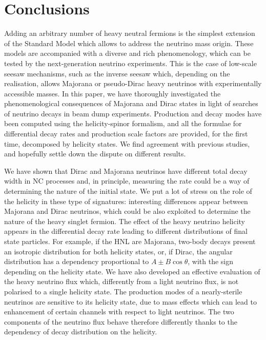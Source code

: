 \clearpage
\chapter{Conclusions}
\label{sec:conclusions}

Adding an arbitrary number of heavy neutral fermions is the simplest extension of the Standard Model which allows to address the neutrino mass origin.
These models are accompanied with a diverse and rich phenomenology, %
which can be tested by the next-generation neutrino experiments.
This is the case of low-scale seesaw mechanisms, such as the inverse seesaw %
which, depending on the realisation, allows Majorana or pseudo-Dirac heavy neutrinos with experimentally accessible masses.
In this paper, we have thoroughly investigated the phenomenological consequences of Majorana and Dirac states %
in light of searches of neutrino decays in beam dump experiments.
Production and decay modes have been computed using the helicity-spinor formalism, %
and all the formulae for differential decay rates and production scale factors are provided, for the first time, decomposed by helicity states.
We find agreement with previous studies, and hopefully settle down the dispute on different results.

We have shown that Dirac and Majorana neutrinos have different total decay width in NC processes %
and, in principle, measuring the rate could be a way of determining the nature of the initial state.
We put a lot of stress on the role of the helicity in these type of signatures: %
interesting differences appear between Majorana and Dirac neutrinos, which could be also %
exploited to determine the nature of the heavy singlet fermion.
The effect of the heavy neutrino helicity appears in the differential decay rate leading to different %
distributions of final state particles. %
For example, if the HNL are Majorana, two-body decays present an isotropic distribution for both helicity states, %
or, if Dirac, the angular distribution has a dependency proportional to $A\pm B \cos\theta$, %
with the sign depending on the helicity state.
We have also developed an effective evaluation of the heavy neutrino flux which, differently from a light neutrino flux, %
is not polarised to a single helicity state.
The production modes of a nearly-sterile neutrinos are sensitive to its helicity state, %
due to mass effects which can lead to enhancement of certain channels with respect to light neutrinos.
The two components of the neutrino flux behave therefore differently thanks to the dependency of decay distribution on the helicity.

